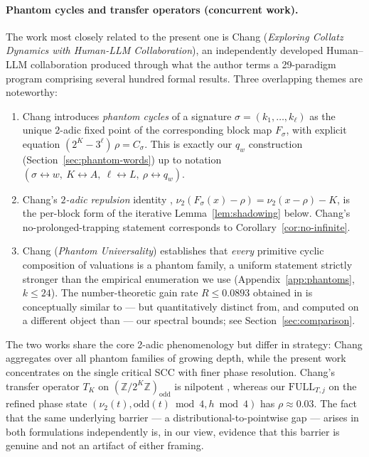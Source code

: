 \documentclass[11pt,a4paper]{article}
\theoremstyle{definition}
\newcommand{\Z}{\mathbb{Z}}
\newcommand{\full}{\mathrm{FULL}}
\newcommand{\spec}{\rho}
\begin{document}
\paragraph{Phantom cycles and transfer operators (concurrent work).}
The work most closely related to the present one is Chang
\cite{chang2026} (\emph{Exploring Collatz Dynamics with Human-LLM
Collaboration}), an independently developed Human--LLM
collaboration produced through what the author terms a 29-paradigm
program comprising several hundred formal results. Three
overlapping themes are noteworthy:
\begin{enumerate}
  \item Chang \cite[Def.~7.2]{chang2026} introduces \emph{phantom
        cycles} of a signature $\sigma = (k_1, \ldots, k_\ell)$ as
        the unique $2$-adic fixed point of the corresponding block
        map $F_\sigma$, with explicit equation
        $(2^K - 3^\ell)\, \rho = C_\sigma$. This is exactly our
        $q_w$ construction (Section~\ref{sec:phantom-words}) up to
        notation $(\sigma \leftrightarrow w,\ K \leftrightarrow A,
        \ \ell \leftrightarrow L,\ \rho \leftrightarrow q_w)$.
  \item Chang's \emph{$2$-adic repulsion} identity
        \cite[Prop.~7.4]{chang2026},
        $\nu_2(F_\sigma(x) - \rho) = \nu_2(x - \rho) - K$,
        is the per-block form of the iterative
        Lemma~\ref{lem:shadowing} below. Chang's no-prolonged-trapping
        statement \cite[Lemma~9.20]{chang2026} corresponds to
        Corollary~\ref{cor:no-infinite}.
  \item Chang \cite[Theorem 7.15]{chang2026} (\emph{Phantom
        Universality}) establishes that \emph{every} primitive
        cyclic composition of valuations is a phantom family, a
        uniform statement strictly stronger than the empirical
        enumeration we use (Appendix~\ref{app:phantoms}, $k \le 24$).
        The number-theoretic gain rate $R \le 0.0893$ obtained in
        \cite[Theorem~7.19]{chang2026} is conceptually similar to
        --- but quantitatively distinct from, and computed on a
        different object than --- our spectral bounds; see
        Section~\ref{sec:comparison}.
\end{enumerate}
The two works share the core 2-adic phenomenology but differ in
strategy: Chang aggregates over all phantom families of growing
depth, while the present work concentrates on the single critical
SCC with finer phase resolution. Chang's transfer operator $T_K$
on $(\Z/2^K\Z)_{\mathrm{odd}}$ is nilpotent
\cite[Remark~9.17]{chang2026}, whereas our $\full_{T,j}$ on the
refined phase state $(\nu_2(t), \mathrm{odd}(t) \bmod 4,
h \bmod 4)$ has $\spec \approx 0.03$. The fact that the same
underlying barrier --- a distributional-to-pointwise gap --- arises
in both formulations independently is, in our view, evidence that
this barrier is genuine and not an artifact of either framing.
\end{document}
